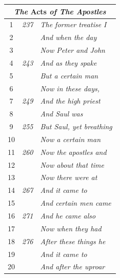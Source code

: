 \documentclass{article}
\newlength{\minipageheight}
\newlength{\minipagewidth}
\begin{document}
\begin{minipage}[r][\minipageheight][t]{\minipagewidth}
\begin{longtable}{ccl}
        \multicolumn{3}{c}{\textbf{\textit{The} Acts \textit{of The Apostles}}} \\
        \hline
        1           & \textit{237} & \textit{The former treatise I}             \\
        2           &              & \textit{And when the day}                  \\
        3           &              & \textit{Now Peter and John}                \\
        4           & \textit{243} & \textit{And as they spake}                 \\
        5           &              & \textit{But a certain man}                 \\
        6           &              & \textit{Now in these days,}                \\
        7           & \textit{249} & \textit{And the high priest}               \\
        8           &              & \textit{And Saul was}                      \\%
        9           & \textit{255} & \textit{But Saul, yet breathing}           \\
        10          &              & \textit{Now a certain man}                 \\
        11          & \textit{260} & \textit{Now the apostles and}              \\
        12          &              & \textit{Now about that time}               \\
        13          &              & \textit{Now there were at}                 \\
        14          & \textit{267} & \textit{And it came to}                    \\
        15          &              & \textit{And certain men came}              \\
        16          & \textit{271} & \textit{And he came also}                  \\
        17          &              & \textit{Now when they had}                 \\
        18          & \textit{276} & \textit{After these things he}             \\
        19          &              & \textit{And it came to}                    \\
        20          &              & \textit{And after the uproar}              \\

\end{longtable}
\end{minipage}
\end{document}
